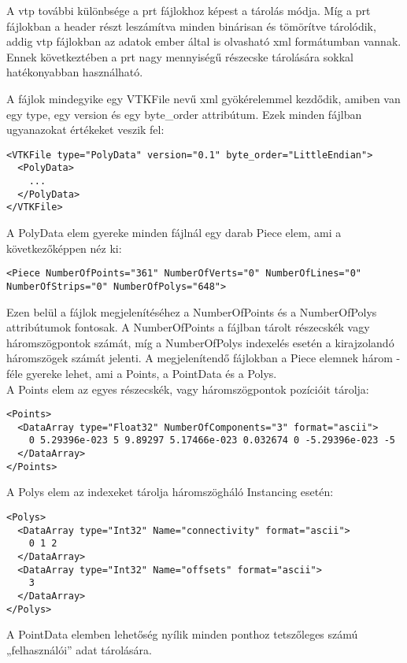 A vtp további különbsége a prt fájlokhoz képest a tárolás módja. 
Míg a prt fájlokban a header részt leszámítva minden binárisan és tömörítve tárolódik, 
addig vtp fájlokban az adatok ember által is olvasható xml formátumban vannak. 
Ennek következtében a prt nagy mennyiségű részecske tárolására 
sokkal hatékonyabban használható. 

A fájlok mindegyike egy {\ttfamily VTKFile} nevű xml gyökérelemmel kezdődik, 
amiben van egy {\ttfamily type}, 
egy {\ttfamily version} 
és egy {\ttfamily byte\_order} attribútum. 
Ezek minden fájlban ugyanazokat értékeket veszik fel:
\begin{lstlisting}[style=customxml]
<VTKFile type="PolyData" version="0.1" byte_order="LittleEndian">
  <PolyData>
    ...
  </PolyData>
</VTKFile>
\end{lstlisting}
A {\ttfamily PolyData} elem gyereke minden fájlnál 
egy darab {\ttfamily Piece} elem, 
ami a következőképpen néz ki:
\begin{lstlisting}[style=customxml]
<Piece NumberOfPoints="361" NumberOfVerts="0" NumberOfLines="0" NumberOfStrips="0" NumberOfPolys="648">
\end{lstlisting}
Ezen belül a fájlok megjelenítéséhez 
a {\ttfamily NumberOfPoints} 
és a {\ttfamily NumberOfPolys} attribútumok fontosak. 
A {\ttfamily NumberOfPoints} a fájlban tárolt részecskék 
vagy háromszögpontok számát, 
míg a {\ttfamily NumberOfPolys} indexelés esetén 
a kirajzolandó háromszögek számát jelenti. 
A megjelenítendő fájlokban a {\ttfamily Piece} elemnek három -féle gyereke lehet, 
ami a {\ttfamily Points}, a {\ttfamily PointData} és a {\ttfamily Polys}.
\\
A {\ttfamily Points} elem az egyes részecskék, 
vagy háromszögpontok pozícióit tárolja:
\begin{lstlisting}[style=customxml]
<Points>
  <DataArray type="Float32" NumberOfComponents="3" format="ascii">
    0 5.29396e-023 5 9.89297 5.17466e-023 0.032674 0 -5.29396e-023 -5 
  </DataArray>
</Points>
\end{lstlisting}
A {\ttfamily Polys} elem az indexeket tárolja háromszögháló Instancing esetén:
\begin{lstlisting}[style=customxml]
<Polys>
  <DataArray type="Int32" Name="connectivity" format="ascii">
    0 1 2
  </DataArray>
  <DataArray type="Int32" Name="offsets" format="ascii">
    3
  </DataArray>
</Polys>
\end{lstlisting}
A {\ttfamily PointData} elemben lehetőség nyílik minden ponthoz 
tetszőleges számú „felhasználói” adat tárolására. 
